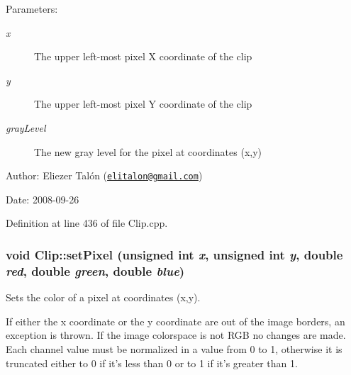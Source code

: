 \begin{Desc}
\item[Parameters:]
\begin{description}
\item[{\em x}]The upper left-most pixel X coordinate of the clip \item[{\em y}]The upper left-most pixel Y coordinate of the clip \item[{\em grayLevel}]The new gray level for the pixel at coordinates (x,y)\end{description}
\end{Desc}
\begin{Desc}
\item[Author:]Eliezer Talón (\href{mailto:elitalon@gmail.com}{\tt elitalon@gmail.com}) \end{Desc}
\begin{Desc}
\item[Date:]2008-09-26 \end{Desc}


Definition at line 436 of file Clip.cpp.\hypertarget{class_clip_1e28a9ed2676460de4b5b9ab1b985f4c}{
\subsubsection[setPixel]{\setlength{\rightskip}{0pt plus 5cm}void Clip::setPixel (unsigned int {\em x}, \/  unsigned int {\em y}, \/  double {\em red}, \/  double {\em green}, \/  double {\em blue})}}
\label{class_clip_1e28a9ed2676460de4b5b9ab1b985f4c}


Sets the color of a pixel at coordinates (x,y). 

If either the x coordinate or the y coordinate are out of the image borders, an exception is thrown. If the image colorspace is not RGB no changes are made. Each channel value must be normalized in a value from 0 to 1, otherwise it is truncated either to 0 if it's less than 0 or to 1 if it's greater than 1.

